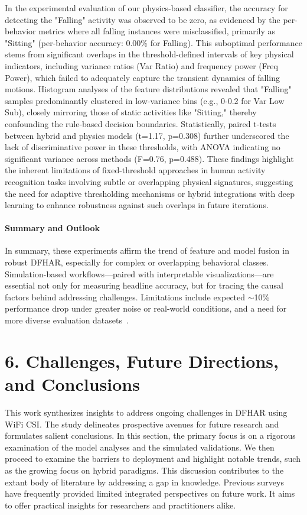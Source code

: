 \documentclass[Afour,sageh,times]{sagej}
\begin{document}
In the experimental evaluation of our physics-based classifier, the accuracy for detecting the "Falling" activity was observed to be zero, as evidenced by the per-behavior metrics where all falling instances were misclassified, primarily as "Sitting" (per-behavior accuracy: 0.00\% for Falling). This suboptimal performance stems from significant overlaps in the threshold-defined intervals of key physical indicators, including variance ratios (Var Ratio) and frequency power (Freq Power), which failed to adequately capture the transient dynamics of falling motions. Histogram analyses of the feature distributions revealed that "Falling" samples predominantly clustered in low-variance bins (e.g., 0-0.2 for Var Low Sub), closely mirroring those of static activities like "Sitting," thereby confounding the rule-based decision boundaries. Statistically, paired t-tests between hybrid and physics models (t=1.17, p=0.308) further underscored the lack of discriminative power in these thresholds, with ANOVA indicating no significant variance across methods (F=0.76, p=0.488). These findings highlight the inherent limitations of fixed-threshold approaches in human activity recognition tasks involving subtle or overlapping physical signatures, suggesting the need for adaptive thresholding mechanisms or hybrid integrations with deep learning to enhance robustness against such overlaps in future iterations.

\paragraph{Summary and Outlook}


In summary, these experiments affirm the trend of feature and model fusion in robust DFHAR, especially for complex or overlapping behavioral classes. Simulation-based workflows—paired with interpretable visualizations—are essential not only for measuring headline accuracy, but for tracing the causal factors behind addressing challenges.  
Limitations include expected $\sim$10\% performance drop under greater noise or real-world conditions, and a need for more diverse evaluation datasets~\citep{shi2022environment}.


\section{6. Challenges, Future Directions, and Conclusions}
\label{sec:challenges_future_conclusions}

This work synthesizes insights to address ongoing challenges in DFHAR using WiFi CSI. The study delineates prospective avenues for future research and formulates salient conclusions. In this section, the primary focus is on a rigorous examination of the model analyses and the simulated validations. We then proceed to examine the barriers to deployment and highlight notable trends, such as the growing focus on hybrid paradigms. This discussion contributes to the extant body of literature by addressing a gap in knowledge. Previous surveys have frequently provided limited integrated perspectives on future work\citep{yang2022deep, guo2019robust}. It aims to offer practical insights for researchers and practitioners alike.
\end{document}
